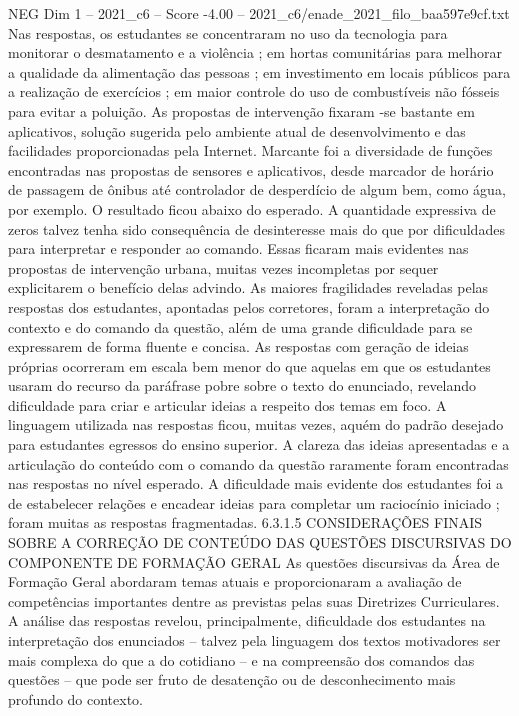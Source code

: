 \begin{textsample}{NEG Dim 1 – 2021\_c6 – Score -4.00 – 2021\_c6/enade\_2021\_filo\_baa597e9cf.txt}
Nas respostas, os estudantes se concentraram no uso da tecnologia para monitorar o desmatamento e a violência ; em hortas comunitárias para melhorar a qualidade da alimentação das pessoas ; em investimento em locais públicos para a realização de exercícios ; em maior controle do uso de combustíveis não fósseis para evitar a poluição.
As propostas de intervenção fixaram -se bastante em aplicativos, solução sugerida pelo ambiente atual de desenvolvimento e das facilidades proporcionadas pela Internet.
Marcante foi a diversidade de funções encontradas nas propostas de sensores e aplicativos, desde marcador de horário de passagem de ônibus até controlador de desperdício de algum bem, como água, por exemplo.
O resultado ficou abaixo do esperado.
A quantidade expressiva de zeros talvez tenha sido consequência de desinteresse mais do que por dificuldades para interpretar e responder ao comando.
Essas ficaram mais evidentes nas propostas de intervenção urbana, muitas vezes incompletas por sequer explicitarem o benefício delas advindo.
As maiores fragilidades reveladas pelas respostas dos estudantes, apontadas pelos corretores, foram a interpretação do contexto e do comando da questão, além de uma grande dificuldade para se expressarem de forma fluente e concisa.
As respostas com geração de ideias próprias ocorreram em escala bem menor do que aquelas em que os estudantes usaram do recurso da paráfrase pobre sobre o texto do enunciado, revelando dificuldade para criar e articular ideias a respeito dos temas em foco.
A linguagem utilizada nas respostas ficou, muitas vezes, aquém do padrão desejado para estudantes egressos do ensino superior.
A clareza das ideias apresentadas e a articulação do conteúdo com o comando da questão raramente foram encontradas nas respostas no nível esperado.
A dificuldade mais evidente dos estudantes foi a de estabelecer relações e encadear ideias para completar um raciocínio iniciado ; foram muitas as respostas fragmentadas. 6.3.1.5 CONSIDERAÇÕES FINAIS SOBRE A CORREÇÃO DE CONTEÚDO DAS QUESTÕES DISCURSIVAS DO COMPONENTE DE FORMAÇÃO GERAL As questões discursivas da Área de Formação Geral abordaram temas atuais e proporcionaram a avaliação de competências importantes dentre as previstas pelas suas Diretrizes Curriculares.
A análise das respostas revelou, principalmente, dificuldade dos estudantes na interpretação dos enunciados – talvez pela linguagem dos textos motivadores ser mais complexa do que a do cotidiano – e na compreensão dos comandos das questões – que pode ser fruto de desatenção ou de desconhecimento mais profundo do contexto.

\end{textsample}
